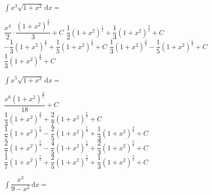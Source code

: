 \begin{questions}
    \question $\int x^3\sqrt{1 + x^2} \,\mathrm{d}x = $ \\

    \begin{oneparchoices}
        \choice $\dfrac{x^4}{2} \cdot \dfrac{\left(1 + x^2\right)^{\frac{3}{2}}}{3} + C$
        \choice $\dfrac{1}{2}\left(1 + x^2\right)^{\frac{1}{2}} + \dfrac{1}{3}\left(1 + x^2\right)^{\frac{3}{2}} + C$ \\[11pt]
        \makebox[0.035\textwidth] \choice $-\dfrac{1}{3}\left(1 + x^2\right)^{\frac{3}{2}} + \dfrac{1}{5}\left(1 + x^2\right)^{\frac{5}{2}} + C$
        \choice $\dfrac{1}{3}\left(1 + x^2\right)^{\frac{3}{2}} - \dfrac{1}{5}\left(1 + x^2\right)^{\frac{5}{2}} + C$ \\[11pt]
        \makebox[0.035\textwidth] \choice $\dfrac{1}{3}\left(1 + x^2\right)^{\frac{3}{2}} + C$
    \end{oneparchoices} \par \horizontalline

    \question $\int x^5\sqrt{1 + x^2} \,\mathrm{d}x = $ \\
    
    \begin{oneparchoices}
        \choice $\dfrac{x^6\left(1 + x^2\right)^{\frac{3}{2}}}{18} + C$ \\[11pt]
        \makebox[0.035\textwidth] \choice $\dfrac{1}{3}\left(1 + x^2\right)^{\frac{3}{2}} + \dfrac{2}{7}\left(1 + x^2\right)^{\frac{7}{2}} + C$ \\[11pt]
        \makebox[0.035\textwidth] \choice $\dfrac{1}{7}\left(1 + x^2\right)^{\frac{7}{2}} - \dfrac{2}{5}\left(1 + x^2\right)^{\frac{5}{2}} + \dfrac{1}{3}\left(1 + x^2\right)^{\frac{3}{2}} + C$ \\[11pt]
        \makebox[0.035\textwidth] \choice $\dfrac{2}{7}\left(1 + x^2\right)^{\frac{7}{2}} - \dfrac{4}{5}\left(1 + x^2\right)^{\frac{5}{2}} + \dfrac{2}{3}\left(1 + x^2\right)^{\frac{3}{2}} + C$ \\[11pt]
        \makebox[0.035\textwidth] \choice $\dfrac{1}{7}\left(1 + x^2\right)^{\frac{7}{2}} + \dfrac{2}{5}\left(1 + x^2\right)^{\frac{5}{2}} + \dfrac{1}{3}\left(1 + x^2\right)^{\frac{3}{2}} + C$ 
    \end{oneparchoices} \par \horizontalline

    \question $\int \dfrac{x^3}{9 - x^2} \,\mathrm{d}x = $ \\


\end{questions}
